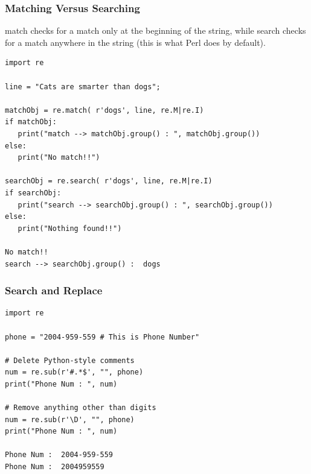  \begin{frame}[fragile]
\frametitle{Matching Versus Searching } 
match checks for a match only at the beginning of the string, while search checks for a match anywhere in the string (this is what Perl does by default).
\begin{lstlisting}
import re

line = "Cats are smarter than dogs";

matchObj = re.match( r'dogs', line, re.M|re.I)
if matchObj:
   print("match --> matchObj.group() : ", matchObj.group())
else:
   print("No match!!")

searchObj = re.search( r'dogs', line, re.M|re.I)
if searchObj:
   print("search --> searchObj.group() : ", searchObj.group())
else:
   print("Nothing found!!")

No match!!
search --> searchObj.group() :  dogs
\end{lstlisting}

\end{frame}

 \begin{frame}[fragile]
\frametitle{Search and Replace } 

\begin{lstlisting}
import re

phone = "2004-959-559 # This is Phone Number"

# Delete Python-style comments
num = re.sub(r'#.*$', "", phone)
print("Phone Num : ", num)

# Remove anything other than digits
num = re.sub(r'\D', "", phone)
print("Phone Num : ", num)

Phone Num :  2004-959-559
Phone Num :  2004959559
\end{lstlisting}

\end{frame}



%
%
%
%
%
%
%


